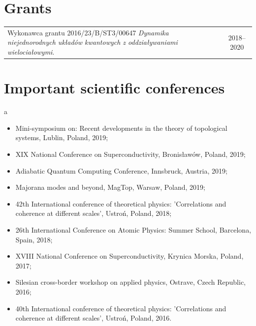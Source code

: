 \ornament

\section*{Grants}

\begin{tabular}{p{12cm}c}
Wykonawca grantu 2016/23/B/ST3/00647 \textit{Dynamika niejednorodnych układów kwantowych z oddziaływaniami wielociałowymi}. & 2018--2020
\end{tabular}

\ornament

\vspace{-0.1cm}

\section*{Important scientific conferences}

\phantom a
\vspace{-5ex}

\begin{itemize}
\item Mini-symposium on: Recent developments in the theory of topological systems, Lublin, Poland, 2019;

\item XIX National Conference on Superconductivity, Bronisławów, Poland, 2019;

\item Adiabatic Quantum Computing Conference, Innsbruck, Austria, 2019;

\item Majorana modes and beyond, MagTop, Warsaw, Poland, 2019;

\item 42th International conference of theoretical physics: ’Correlations and coherence at different scales’, Ustroń, Poland, 2018;

\item 26th International Conference on Atomic Physics: Summer School, Barcelona, Spain, 2018;

\item XVIII National Conference on Superconductivity, Krynica Morska, Poland, 2017;

\item Silesian cross-border workshop on applied physics, Ostrave, Czech Republic, 2016;

\item 40th International conference of theoretical physics: ’Correlations and coherence at different scales’, Ustroń, Poland, 2016.
\end{itemize}

\ornament